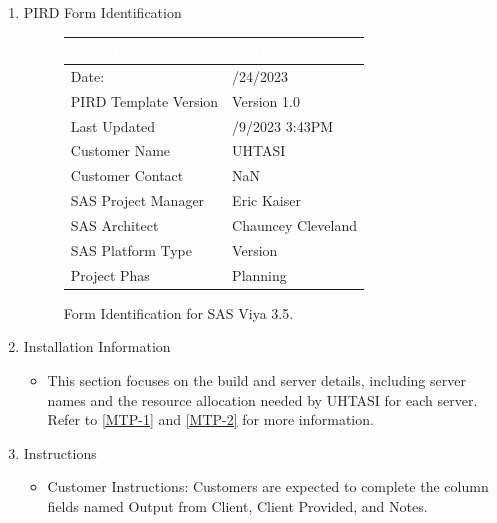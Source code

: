 \begin{enumerate}
    \item PIRD Form Identification
    \begin{figure}[H]
    \begin{center}
        \renewcommand{\arraystretch}{1.5}
        \begin{tabular}{|>{\raggedright\arraybackslash}m{5cm}
                        |>{\raggedright\arraybackslash}m{4cm}
                        |}
        \hline
        \rowcolor[HTML]{196fb4}\centering\textcolor{white}{\large Form Identification} 
                                & \centering\textcolor{white}{\large Metadata} 
                                \tabularnewline 
        \hline
        Date: & 4/24/2023 \\\hline
        PIRD Template Version & Version 1.0 \\\hline
        Last Updated & 5/9/2023 3:43PM\\\hline
        Customer Name & UHTASI \\\hline
        Customer Contact & NaN \\\hline
        SAS Project Manager& Eric Kaiser \\\hline
        SAS Architect & Chauncey Cleveland \\\hline
        SAS Platform Type & Version \\\hline
        Project Phas & Planning \\\hline
        \end{tabular}
    \end{center}
    \caption{Form Identification for SAS Viya 3.5.}
    \label{PIRD-VIYA}
    \end{figure}
    \item Installation Information 
    \begin{itemize}
        \item This section focuses on the build and server details, including server names and the resource allocation needed by UHTASI for each server. Refer to \ref{MTP-1} and \ref{MTP-2} for more information.
    \end{itemize}
    \item Instructions
    \begin{itemize}
        \item Customer Instructions: Customers are expected to complete the column fields named Output from Client, Client Provided, and Notes. 

\end{itemize}
\end{enumerate}

